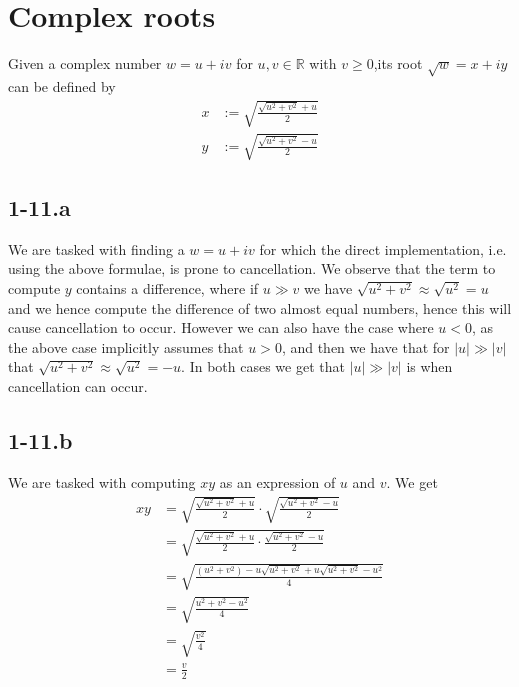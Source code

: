 \documentclass{article}
\begin{document}
\section*{Complex roots}
Given a complex number $w = u +iv$ for $u,v \in \mathbb{R}$ with $v \geq 0$,its root $\sqrt{w} = x + iy$ can be defined by
\begin{align*}
    x &:= \sqrt{\frac{\sqrt{u^{2}+v^{2}} + u}{2}} \\[2mm]
    y &:= \sqrt{\frac{\sqrt{u^{2}+v^{2}} - u}{2}}
\end{align*}
\subsection*{1-11.a}
We are tasked with finding a $w = u + iv$ for which the direct implementation, i.e. using the above formulae, is prone to cancellation. We observe that the term to compute $y$ contains a difference, where if $u \gg v$ we have $\sqrt{u^{2}+v^{2}} \approx \sqrt{u^{2}} = u$ and we hence compute the difference of two almost equal numbers, hence this will cause cancellation to occur. However we can also have the case where $u < 0$, as the above case implicitly assumes that $u > 0$, and then we have that for $|u| \gg |v|$ that $\sqrt{u^{2} + v^{2}} \approx \sqrt{u^{2}} = -u$. In both cases we get that $|u| \gg |v|$ is when cancellation can occur.
\subsection*{1-11.b}
We are tasked with computing $xy$ as an expression of $u$ and $v$. We get
\begin{align*}
    xy &= \sqrt{\frac{\sqrt{u^{2}+v^{2}} + u}{2}} \cdot\sqrt{\frac{\sqrt{u^{2}+v^{2}} - u}{2}} \\
    &= \sqrt{\frac{\sqrt{u^{2}+v^{2}} + u}{2}\cdot \frac{\sqrt{u^{2}+v^{2}} - u}{2}} \\
    &= \sqrt{\frac{\left(u^{2}+v^{2}\right) -u\sqrt{u^{2} +v^{2}} + u\sqrt{u^{2}+v^{2}}- u^{2}}{4}} \\
    &= \sqrt{\frac{u^{2}+v^{2}-u^{2}}{4}} \\
    &= \sqrt{\frac{v^{2}}{4}} \\
    &= \frac{v}{2}
\end{align*}

\pagebreak
\end{document}
